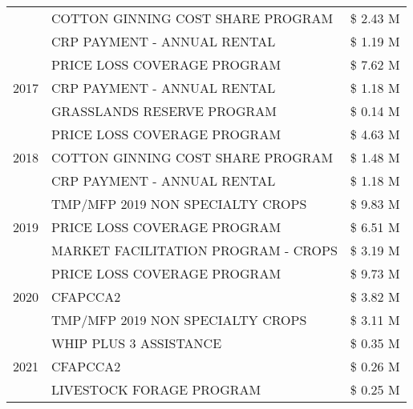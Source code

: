 \begin{tabular}{llr}
 & COTTON GINNING COST SHARE PROGRAM & \$ 2.43 M \\
 & CRP PAYMENT - ANNUAL RENTAL & \$ 1.19 M \\
\cline{1-3}
\multirow[t]{3}{*}{2017} & PRICE LOSS COVERAGE PROGRAM & \$ 7.62 M \\
 & CRP PAYMENT - ANNUAL RENTAL & \$ 1.18 M \\
 & GRASSLANDS RESERVE PROGRAM & \$ 0.14 M \\
\cline{1-3}
\multirow[t]{3}{*}{2018} & PRICE LOSS COVERAGE PROGRAM & \$ 4.63 M \\
 & COTTON GINNING COST SHARE PROGRAM & \$ 1.48 M \\
 & CRP PAYMENT - ANNUAL RENTAL & \$ 1.18 M \\
\cline{1-3}
\multirow[t]{3}{*}{2019} & TMP/MFP 2019 NON SPECIALTY CROPS & \$ 9.83 M \\
 & PRICE LOSS COVERAGE PROGRAM & \$ 6.51 M \\
 & MARKET FACILITATION PROGRAM - CROPS & \$ 3.19 M \\
\cline{1-3}
\multirow[t]{3}{*}{2020} & PRICE LOSS COVERAGE PROGRAM & \$ 9.73 M \\
 & CFAPCCA2 & \$ 3.82 M \\
 & TMP/MFP 2019 NON SPECIALTY CROPS & \$ 3.11 M \\
\cline{1-3}
\multirow[t]{3}{*}{2021} & WHIP PLUS 3 ASSISTANCE & \$ 0.35 M \\
 & CFAPCCA2 & \$ 0.26 M \\
 & LIVESTOCK FORAGE PROGRAM & \$ 0.25 M \\
\cline{1-3}
\bottomrule
\end{tabular}
